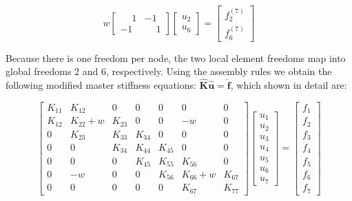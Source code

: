\documentclass[10pt,b5paper,titlepage]{book}
\newcommand{\m}{\mathbf}
\begin{document}
\begin{equation}
    w \begin{bmatrix}
        \phantom{-}1 & -1 \\
        -1 & \phantom{-}1
    \end{bmatrix}
    \begin{bmatrix}
        u_2 \\
        u_6
    \end{bmatrix}
    = \begin{bmatrix}
        f_2^{(7)} \\
        f_6^{(7)}
    \end{bmatrix}
\end{equation}

Because there is one freedom per node, the two local element freedoms map into global
freedoms 2 and 6, respectively. Using the assembly rules we obtain the following
modified master stiffness equations: $ \m{\hat{K}} \m{\hat{u}} = \m{\hat{f}} $,
which shown in detail are:

\begin{equation}\label{mfc-penalty-master-stiffnes}
    \begin{bmatrix}
        K_{11} & K_{12} & 0 & 0 & 0 & 0 & 0 \\
        K_{12} & K_{22} + w & K_{23} & 0 & 0 & -w & 0 \\
        0 & K_{23} & K_{33} & K_{34} & 0 & 0 & 0 \\
        0 & 0 & K_{34} & K_{44} & K_{45} & 0 & 0 \\
        0 & 0 & 0 & K_{45} & K_{55} & K_{56} & 0 \\
        0 & -w & 0 & 0 & K_{56} & K_{66} + w & K_{67} \\
        0 & 0 & 0 & 0 & 0 & K_{67} & K_{77}
    \end{bmatrix}
    \begin{bmatrix}
        u_1 \\
        u_2 \\
        u_3 \\
        u_4 \\
        u_5 \\
        u_6 \\
        u_7
    \end{bmatrix}
    = \begin{bmatrix}
        f_1 \\
        f_2 \\
        f_3 \\
        f_4 \\
        f_5 \\
        f_6 \\
        f_7
    \end{bmatrix}
\end{equation}
\end{document}
